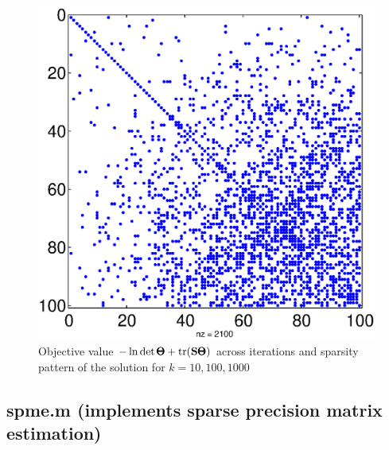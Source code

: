 \documentclass{scrartcl}
\begin{document}
\begin{figure}[H]
\begin{minipage}[b]{0.31\textwidth}
  \end{minipage}
  \quad  
  \begin{minipage}[b]{0.31\textwidth}
    \centering
    \includegraphics[scale=0.35]{prob_28_sp_k_1000.eps}
  \end{minipage}
  \caption{Objective value $-\ln \det \pmb{\Theta} + \mathrm{tr}(\mathbf{S} \pmb{\Theta})$ across iterations and sparsity pattern of the solution
  for $k=10,100,1000$}
  \label{fig:prob8_result}
\end{figure}

\subsection*{spme.m (implements sparse precision matrix estimation)}
\end{document}
